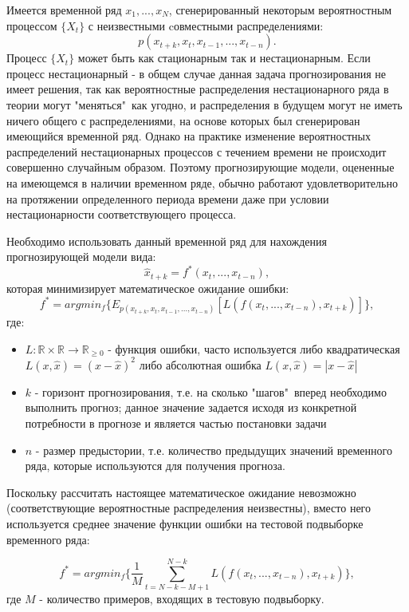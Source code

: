 \documentclass[11pt]{article}
\begin{document}
Имеется временной ряд ${x_1, ..., x_N}$, сгенерированный некоторым вероятностным процессом $ \{X_t\} $ с неизвестными cовместными распределениями:
$$ p(x_{t+k}, x_{t}, x_{t-1}, ..., x_{t-n}). $$
Процесс $ \{X_t\} $ может быть как стационарным так и нестационарным. Если процесс нестационарный - в общем случае данная задача прогнозирования не имеет решения, так как вероятностные распределения нестационарного ряда в теории могут "меняться"\ как угодно, и распределения в будущем могут не иметь ничего общего с распределениями, на основе которых был сгенерирован имеющийся временной ряд. Однако на практике изменение вероятностных распределений нестационарных процессов с течением времени не происходит совершенно случайным образом. Поэтому прогнозирующие модели, оцененные на имеющемся в наличии временном ряде, обычно работают удовлетворительно на протяжении определенного периода времени даже при условии нестационарности соответствующего процесса.

Необходимо использовать данный временной ряд для нахождения прогнозирующей модели вида:
$$ \hat{x}_{t+k} = f^*(x_{t}, ..., x_{t-n}), $$
которая минимизирует математическое ожидание ошибки:
$$ f^* = argmin_f \{ E_{p(x_{t+k}, x_{t}, x_{t-1}, ..., x_{t-n})} [ L(f(x_{t}, ..., x_{t-n}), x_{t+k}) ] \}, $$
где:
\begin{itemize}
\item $L: \mathbb{R} \times \mathbb{R} \to \mathbb{R}_{\geq 0} $ - функция ошибки, часто используется либо квадратическая $ L(x, \hat{x}) = (x-\hat{x})^2 $ либо абсолютная ошибка $ L(x, \hat{x}) = |x-\hat{x}| $
\item $k$ - горизонт прогнозирования, т.е. на сколько "шагов"\ вперед необходимо выполнить прогноз; данное значение задается исходя из конкретной потребности в прогнозе и является частью постановки задачи
\item $n$ - размер предыстории, т.е. количество предыдущих значений временного ряда, которые используются для получения прогноза.
\end{itemize}
Поскольку рассчитать настоящее математическое ожидание невозможно (соответствующие вероятностные распределения неизвестны), вместо него используется среднее значение функции ошибки на тестовой подвыборке временного ряда:

$$ f^* = argmin_f \{ \frac{1}{M} \sum_{t=N-k-M+1}^{N - k}{L(f(x_t, ..., x_{t-n}), x_{t+k})} \}, $$
где $M$ - количество примеров, входящих в тестовую подвыборку.
\end{document}
